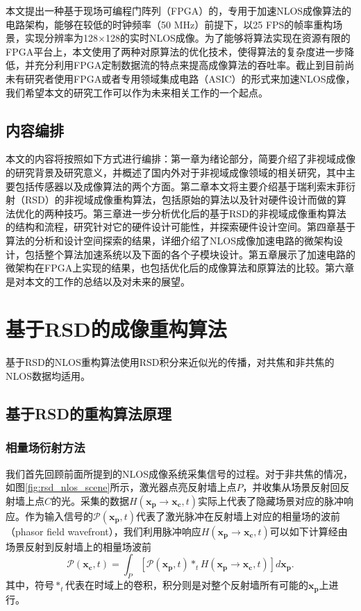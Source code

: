 \documentclass[master]{shtthesis}             %
\begin{document}
本文提出一种基于现场可编程门阵列（FPGA）的，专用于加速NLOS成像算法的电路架构，能够在较低的时钟频率（50 MHz）前提下，以25 FPS的帧率重构场景，实现分辨率为128$\times$128的实时NLOS成像。为了能够将算法实现在资源有限的FPGA平台上，本文使用了两种对原算法的优化技术，使得算法的复杂度进一步降低，并充分利用FPGA定制数据流的特点来提高成像算法的吞吐率。截止到目前尚未有研究者使用FPGA或者专用领域集成电路（ASIC）的形式来加速NLOS成像，我们希望本文的研究工作可以作为未来相关工作的一个起点。

\section{内容编排}

本文的内容将按照如下方式进行编排：第一章为绪论部分，简要介绍了非视域成像的研究背景及研究意义，并概述了国内外对于非视域成像领域的相关研究，其中主要包括传感器以及成像算法的两个方面。第二章本文将主要介绍基于瑞利索末菲衍射（RSD）的非视域成像重构算法，包括原始的算法以及针对硬件设计而做的算法优化的两种技巧。第三章进一步分析优化后的基于RSD的非视域成像重构算法的结构和流程，研究针对它的硬件设计可能性，并探索硬件设计空间。第四章基于算法的分析和设计空间探索的结果，详细介绍了NLOS成像加速电路的微架构设计，包括整个算法加速系统以及下面的各个子模块设计。第五章展示了加速电路的微架构在FPGA上实现的结果，也包括优化后的成像算法和原算法的比较。第六章是对本文的工作的总结以及对未来的展望。

\chapter{基于RSD的成像重构算法}
 
基于RSD的NLOS重构算法使用RSD积分来近似光的传播，对共焦和非共焦的NLOS数据均适用\citep{Elten2019}。

\section{基于RSD的重构算法原理}

\subsection{相量场衍射方法}

我们首先回顾前面所提到的NLOS成像系统采集信号的过程。对于非共焦的情况，如图\ref{fig:rsd_nlos_scene}所示，激光器点亮反射墙上点$P$，并收集从场景反射回反射墙上点$C$的光。采集的数据$H(\mathbf{x_p}\rightarrow \mathbf{x_c},t)$实际上代表了隐藏场景对应的脉冲响应。作为输入信号的$\mathcal{P}(\mathbf{x_p},t)$代表了激光脉冲在反射墙上对应的相量场的波前（phasor field wavefront），我们利用脉冲响应$H(\mathbf{x_p}\rightarrow \mathbf{x_c},t)$可以如下计算经由场景反射到反射墙上的相量场波前
\begin{equation}\label{eq:convt}
  \mathcal{P}(\mathbf{x_c},t) = \int_P \left[ \mathcal{P}(\mathbf{x_p},t) *_t H(\mathbf{x_p}\rightarrow \mathbf{x_c},t) \right] d\mathbf{x_p}.
\end{equation}
其中，符号$*_t$代表在时域上的卷积，积分则是对整个反射墙所有可能的$\mathbf{x_p}$上进行。
\end{document}
